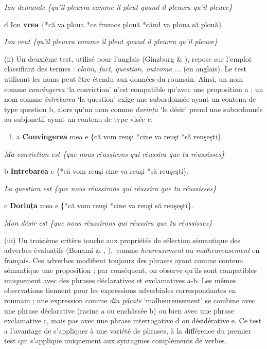 {\itshape
    Ion demande \{qu'il pleuvra {\textbar} comme il pleut {\textbar} quand il pleuvra {\textbar} qu'il pleuve\}}

  d  Ion \textbf{vrea} \{*că va ploua {\textbar} *ce frumos plouă {\textbar} *când va ploua {\textbar} să plouă\}.

{\itshape
    Ion veut \{qu'il pleuvra {\textbar} comme il pleut {\textbar} quand il pleuvra {\textbar} qu'il pleuve\}}

(ii) Un deuxième test, utilisé pour l'anglais (Ginzburg \& \citet{Sag2000}), repose sur l'emploi classifiant des termes : \textit{claim, fact, question, outcome ...} (en anglais). Le test utilisant les noms peut être étendu aux données du roumain. Ainsi, un nom comme \textit{convingerea} `la conviction' n'est compatible qu'avec une proposition a ; un nom comme \textit{întrebarea} `la question' exige une subordonnée ayant un contenu de type question b, alors qu'un nom comme \textit{dorința} `le désir' prend une subordonnée au subjonctif ayant un contenu de type visée c.


\begin{enumerate}
\item \label{bkm:Ref299272048}a  \textbf{Convingerea} mea e \{că vom reuşi {\textbar} *cine va reuşi {\textbar} *să reuşeşti\}.


\end{enumerate}
{\itshape
Ma conviction est \{que nous réussirons {\textbar} qui réussira {\textbar} que tu réussisses\}}

  b  \textbf{Intrebarea} e \{*că vom reuşi {\textbar} cine va reuşi {\textbar} *să reuşeşti\}.

{\itshape
    La question est \{que nous réussirons {\textbar} qui réussira {\textbar} que tu réussisses\} } 

  c  \textbf{Dorința} mea e \{*că vom reuşi {\textbar} *cine va reuşi {\textbar} să reuşeşti\}.

    \textit{Mon désir est \{que nous réussirons {\textbar} qui réussira {\textbar} que tu réussisses\}}

(iii) Un troisième critère touche aux propriétés de sélection sémantique des adverbes évaluatifs (Bonami \& \citet{Godard2005}, \citet{Laurens2007}),~comme \textit{heureusement} ou \textit{malheureusement} en français. Ces adverbes modifient toujours des phrases ayant comme contenu sémantique une proposition ; par conséquent, on observe qu'ils sont compatibles uniquement avec des phrases déclaratives et exclamatives a-b. Les mêmes observations tiennent pour les expressions adverbiales correspondantes en roumain ; une expression comme \textit{din păcate} `malheureusement' se combine avec une phrase déclarative (racine a ou enchâssée b) ou bien avec une phrase exclamative c, mais pas avec une phrase interrogative d ou désidérative e. Ce test a l'avantage de s'appliquer à une variété de phrases, à la différence du premier test qui s'applique uniquement aux syntagmes compléments de verbes.


